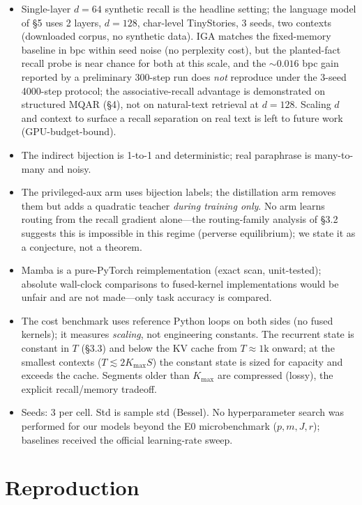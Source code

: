 \documentclass[11pt]{article}
\begin{document}
\begin{itemize}
\item Single-layer $d=64$ synthetic recall is the headline setting; the language
  model of \S5 uses 2 layers, $d=128$, char-level TinyStories, 3 seeds, two
  contexts (downloaded corpus, no synthetic data). IGA matches the fixed-memory
  baseline in bpc within seed noise (no perplexity cost), but the planted-fact
  recall probe is near chance for both at this scale, and the $\sim$$0.016$ bpc
  gain reported by a preliminary 300-step run does \emph{not} reproduce under the
  3-seed 4000-step protocol; the associative-recall advantage is demonstrated on
  structured MQAR (\S4), not on natural-text retrieval at $d=128$. Scaling $d$ and
  context to surface a recall separation on real text is left to future work
  (GPU-budget-bound).
\item The indirect bijection is 1-to-1 and deterministic; real paraphrase is
  many-to-many and noisy.
\item The privileged-aux arm uses bijection labels; the distillation arm removes
  them but adds a quadratic teacher \emph{during training only}. No arm learns
  routing from the recall gradient alone---the routing-family analysis of \S3.2
  suggests this is impossible in this regime (perverse equilibrium); we state it
  as a conjecture, not a theorem.
\item Mamba is a pure-PyTorch reimplementation (exact scan, unit-tested); absolute
  wall-clock comparisons to fused-kernel implementations would be unfair and are
  not made---only task accuracy is compared.
\item The cost benchmark uses reference Python loops on both sides (no fused
  kernels); it measures \emph{scaling}, not engineering constants. The recurrent
  state is constant in $T$ (\S3.3) and below the KV cache from $T\approx 1$k
  onward; at the smallest contexts ($T\lesssim 2K_{\max}S$) the constant state is
  sized for capacity and exceeds the cache. Segments older than $K_{\max}$ are
  compressed (lossy), the explicit recall/memory tradeoff.
\item Seeds: 3 per cell. Std is sample std (Bessel). No hyperparameter search was
  performed for our models beyond the E0 microbenchmark ($p,m,J,r$); baselines
  received the official learning-rate sweep.
\end{itemize}

\section{Reproduction}
\end{document}
